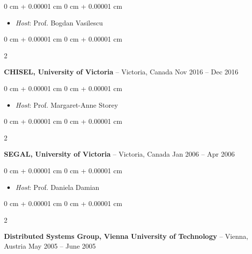 \documentclass[10pt, a4paper]{article}
\newenvironment{highlights}{
    \begin{itemize}[
        topsep=0.10 cm,
        parsep=0.10 cm,
        partopsep=0pt,
        itemsep=0pt,
        leftmargin=0 cm + 10pt
    ]
}{
    \end{itemize}
} %
\newenvironment{onecolentry}{
    \begin{adjustwidth}{
        0 cm + 0.00001 cm
    }{
        0 cm + 0.00001 cm
    }
}{
    \end{adjustwidth}
} %
\newenvironment{twocolentry}[2][]{
    \onecolentry
    \def\secondColumn{#2}
    \setcolumnwidth{\fill, 4.5 cm}
    \begin{paracol}{2}
}{
    \switchcolumn \raggedleft \secondColumn
    \end{paracol}
    \endonecolentry
} %
\begin{document}
        \vspace{0.10 cm}
        \begin{onecolentry}
            \begin{highlights}
                \item \textit{Host}: Prof. Bogdan Vasilescu
            \end{highlights}
        \end{onecolentry}


        \vspace{0.2 cm}

        \begin{twocolentry}{
            Nov 2016 – Dec 2016
        }
            \textbf{CHISEL, University of Victoria} -- Victoria, Canada\end{twocolentry}

        \vspace{0.10 cm}
        \begin{onecolentry}
            \begin{highlights}
                \item \textit{Host}: Prof. Margaret-Anne Storey
            \end{highlights}
        \end{onecolentry}


        \vspace{0.2 cm}

        \begin{twocolentry}{
            Jan 2006 – Apr 2006
        }
            \textbf{SEGAL, University of Victoria} -- Victoria, Canada\end{twocolentry}

        \vspace{0.10 cm}
        \begin{onecolentry}
            \begin{highlights}
                \item \textit{Host}: Prof. Daniela Damian
            \end{highlights}
        \end{onecolentry}


        \vspace{0.2 cm}

        \begin{twocolentry}{
            May 2005 – June 2005
        }
            \textbf{Distributed Systems Group, Vienna University of Technology} -- Vienna, Austria\end{twocolentry}
\end{document}
